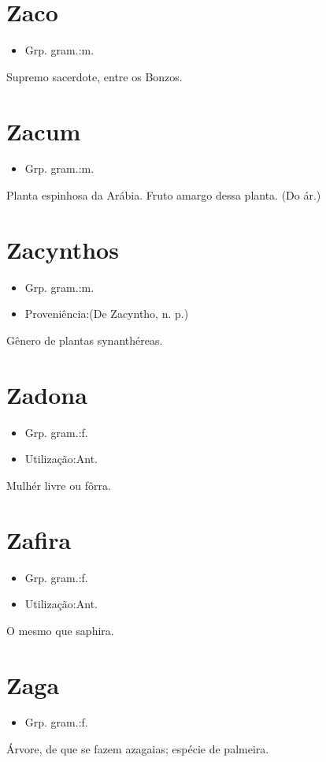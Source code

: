 \section{Zaco}
\begin{itemize}
\item {Grp. gram.:m.}
\end{itemize}
Supremo sacerdote, entre os Bonzos.
\section{Zacum}
\begin{itemize}
\item {Grp. gram.:m.}
\end{itemize}
Planta espinhosa da Arábia.
Fruto amargo dessa planta.
(Do ár.)
\section{Zacynthos}
\begin{itemize}
\item {Grp. gram.:m.}
\end{itemize}
\begin{itemize}
\item {Proveniência:(De \textunderscore Zacyntho\textunderscore , n. p.)}
\end{itemize}
Gênero de plantas synanthéreas.
\section{Zadona}
\begin{itemize}
\item {Grp. gram.:f.}
\end{itemize}
\begin{itemize}
\item {Utilização:Ant.}
\end{itemize}
Mulhér livre ou fôrra.
\section{Zafira}
\begin{itemize}
\item {Grp. gram.:f.}
\end{itemize}
\begin{itemize}
\item {Utilização:Ant.}
\end{itemize}
O mesmo que \textunderscore saphira\textunderscore .
\section{Zaga}
\begin{itemize}
\item {Grp. gram.:f.}
\end{itemize}
Árvore, de que se fazem azagaias; espécie de palmeira.
